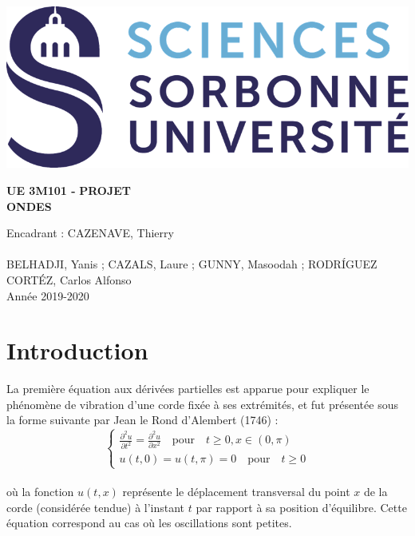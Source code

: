 \documentclass[11pt,a4paper]{article}
\author{BELHADJI, Yanis ; CAZALS, Laure ; GUNNY, Masoodah ; RODRÍGUEZ CORTÉZ, Carlos Alfonso}
\begin{document}
\begin{titlepage}
    \includegraphics[scale=0.4]{logo.png}
    \begin{center}
    \vspace*{7cm}
    {\Huge  \textbf{UE 3M101 - }}{\huge \textbf{PROJET}}
    \\
    \vspace{1.5cm}
    \huge \textbf{ONDES}
    \vfill

    {\large  Encadrant : CAZENAVE, Thierry}
    \\~\\
    {\normalsize BELHADJI, Yanis ; CAZALS, Laure ; GUNNY, Masoodah ; RODRÍGUEZ CORTÉZ, Carlos Alfonso}
    \\
    \vspace{1cm}
    {\normalsize Année 2019-2020}
    \end{center}
\end{titlepage}
 
 
\thispagestyle{empty}
\vspace*{\fill}
\renewcommand{\contentsname}{\Huge Sommaire}
\tableofcontents
\vspace{\fill}


\pagebreak
\setcounter{page}{1}

\section{Introduction}
La première équation aux dérivées partielles est apparue pour expliquer le phénomène de vibration d'une corde fixée à ses extrémités, et fut présentée sous la forme suivante par Jean le Rond d'Alembert (1746) :
    \begin{equation} \label{Ondes} 
    \begin{cases} 
    \displaystyle \frac {\partial ^2 u } {\partial t ^2} = \frac {\partial ^2 u } {\partial x ^2}  \quad  \text{pour}\quad t\ge 0, x\in (0,\pi ) \\ u(t, 0)= u (t, \pi )= 0\quad  \text{pour} \quad t\ge 0
    \end{cases} 
    \end{equation} \\
où la fonction $u(t, x)$ représente le déplacement transversal du point $x$ de la corde (considérée tendue) à l'instant $t$ par rapport à sa position d'équilibre. Cette équation correspond au cas où les oscillations sont petites.\\
\end{document}
